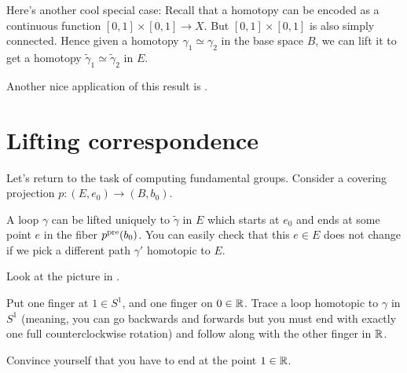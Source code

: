 \begin{remark}
	Here's another cool special case:
	Recall that a homotopy can be encoded as a continuous function $[0,1] \times [0,1] \to X$.
	But $[0,1] \times [0,1]$ is also simply connected.
	Hence given a homotopy $\gamma_1 \simeq \gamma_2$ in the base space $B$, we can lift it to get
 a homotopy $\tilde\gamma_1 \simeq \tilde\gamma_2$ in $E$.
\end{remark}
Another nice application of this result is .

\section{Lifting correspondence}
Let's return to the task of computing fundamental groups.
Consider a covering projection $p : (E, e_0) \to (B, b_0)$.

A loop $\gamma$ can be lifted uniquely to $\tilde\gamma$ in $E$
which starts at $e_0$ and ends at some point $e$ in the fiber $p^{\text{pre}}(b_0)$.
You can easily check that this $e \in E$ does not change if we
pick a different path $\gamma'$ homotopic to $E$.
\begin{ques}
	Look at the picture in .

	Put one finger at $1 \in S^1$, and one finger on $0 \in \mathbb R$.
	Trace a loop homotopic to $\gamma$ in $S^1$ (meaning, you can
	go backwards and forwards but you must end with exactly one full
	counterclockwise rotation)
	and follow along with the other finger in $\mathbb R$.

	Convince yourself that you have to end at the point $1 \in \mathbb R$.
\end{ques}

